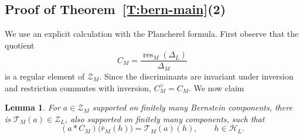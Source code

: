 \documentclass[11pt,a4paper]{amsart}
\newcommand{\mcH}{\mathcal H}
\newcommand{\mcZ}{\mathcal Z}
\newtheorem{lemma}[theorem]{Lemma}
\theoremstyle{definition}
\theoremstyle{remark}
\begin{document}
\subsection{Proof of Theorem~\ref{T:bern-main}\label{SS:bern-transfer}(2)}
We use an explicit calculation with the Plancherel formula.
First observe that the quotient
\begin{equation}\label{E:bern-cross-D}
 C_M=\frac{\operatorname{res}_M(\Delta_L)}{\Delta_M}
\end{equation}
is a regular element of $\mcZ_M$. Since the discriminants are invariant
under inversion and restriction commutes with inversion, $C_M^\vee=C_M$.
We now claim
\begin{lemma}\label{L:bern-transfer}
For $a\in\mcZ_M$ supported on finitely many Bernstein components,
there is $\mathcal T_M(a)\in\mcZ_L$, also supported on finitely many
components, such that
\begin{equation}\label{E:bern-transfer}
 (a*C_M)\bigl(\bar r_M(h)\bigr)
 =\mathcal T_M(a)(h),
 \qquad h\in\mcH_L.
\end{equation}
\end{lemma}
\end{document}
